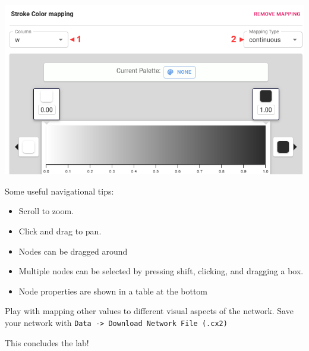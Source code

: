 \documentclass[
]{book}
\providecommand{\tightlist}{%
  \setlength{\itemsep}{0pt}\setlength{\parskip}{0pt}}
\begin{document}
\includegraphics{img/lab4/cytoscape_edge2.png}

Some useful navigational tips:

\begin{itemize}
\tightlist
\item
  Scroll to zoom.
\item
  Click and drag to pan.
\item
  Nodes can be dragged around
\item
  Multiple nodes can be selected by pressing shift, clicking, and dragging a box.
\item
  Node properties are shown in a table at the bottom
\end{itemize}

Play with mapping other values to different visual aspects of the network.
Save your network with \texttt{Data\ -\textgreater{}\ Download\ Network\ File\ (.cx2)}

This concludes the lab!

  
\end{document}
